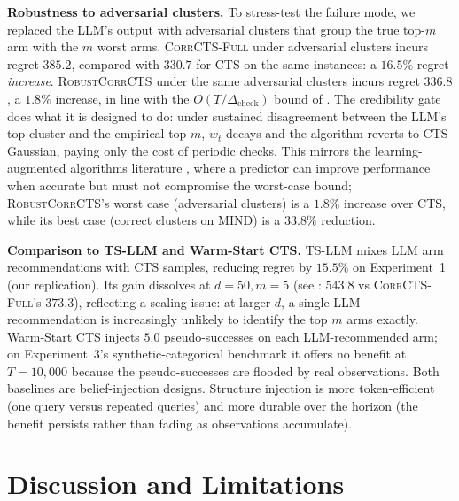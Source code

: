 \documentclass{article}
\theoremstyle{plain}
\theoremstyle{definition}
\theoremstyle{remark}
\newcommand{\CorrFull}{\textsc{CorrCTS-Full}}
\newcommand{\RobustCorr}{\textsc{RobustCorrCTS}}
\begin{document}
\textbf{Robustness to adversarial clusters.}
To stress-test the failure mode, we replaced the LLM's output with adversarial clusters that group the true top-$m$ arm with the $m$ worst arms.
\CorrFull{} under adversarial clusters incurs regret $385.2$, compared with $330.7$ for CTS on the same instances: a $16.5\%$ regret \emph{increase}.
\RobustCorr{} under the same adversarial clusters incurs regret $336.8$, a $1.8\%$ increase, in line with the $O(T/\Delta_{\text{check}})$ bound of .
The credibility gate does what it is designed to do: under sustained disagreement between the LLM's top cluster and the empirical top-$m$, $w_t$ decays and the algorithm reverts to CTS-Gaussian, paying only the cost of periodic checks.
This mirrors the learning-augmented algorithms literature \citep{lykouris2018competitive}, where a predictor can improve performance when accurate but must not compromise the worst-case bound; \RobustCorr{}'s worst case (adversarial clusters) is a $1.8\%$ increase over CTS, while its best case (correct clusters on MIND) is a $33.8\%$ reduction.

\textbf{Comparison to TS-LLM and Warm-Start CTS.}
TS-LLM \citep{sun2025tsllm} mixes LLM arm recommendations with CTS samples, reducing regret by $15.5\%$ on Experiment~1 (our replication).
Its gain dissolves at $d = 50, m = 5$ (see : $543.8$ vs \CorrFull{}'s $373.3$), reflecting a scaling issue: at larger $d$, a single LLM recommendation is increasingly unlikely to identify the top $m$ arms exactly.
Warm-Start CTS injects $5.0$ pseudo-successes on each LLM-recommended arm; on Experiment~3's synthetic-categorical benchmark it offers no benefit at $T = 10{,}000$ because the pseudo-successes are flooded by real observations.
Both baselines are belief-injection designs.
Structure injection is more token-efficient (one query versus repeated queries) and more durable over the horizon (the benefit persists rather than fading as observations accumulate).

\section{Discussion and Limitations}\label{sec:discussion}
\end{document}
